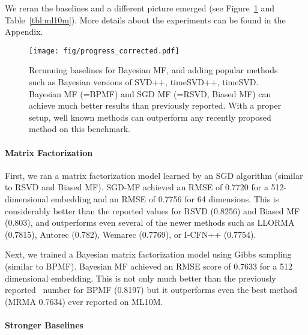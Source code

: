 \documentclass{article}
\newcommand\rmsersvd{0.8256}
\newcommand\rmsebpmf{0.8197}
\newcommand\rmsebiasmf{0.803}
\newcommand\rmseiautorec{0.782}
\newcommand\rmsellorma{0.7815}
\newcommand\rmsewemarec{0.7769}
\newcommand\rmseicfnpp{0.7754}
\newcommand\rmsemrma{0.7634}
\newcommand\rmsebfmui{0.7633}
\newcommand\rmsefmui{0.7720}
\newcommand\rmsefmuimed{0.7756}
\begin{document}
We reran the baselines and a different picture emerged (see Figure~\ref{fig:ml10m_progress_corrected} and Table~\ref{tbl:ml10m}).
More details about the experiments can be found in the Appendix.

\begin{figure}[t]
    \centering
    \texttt{[image: fig/progress\_corrected.pdf]}
    \caption{Rerunning baselines for Bayesian MF, and adding popular methods such as Bayesian versions of SVD++, timeSVD++, timeSVD\protect\footnotemark.
    Bayesian MF (=BPMF) and SGD MF (=RSVD, Biased MF) can achieve much better results than previously reported.
    With a proper setup, well known methods can outperform any recently proposed method on this benchmark.}
    \label{fig:ml10m_progress_corrected}
\end{figure}





\paragraph{Matrix Factorization}

First, we ran a matrix factorization model learned by an SGD algorithm (similar to RSVD and Biased MF).
SGD-MF achieved an RMSE of {\rmsefmui} for a 512-dimensional embedding and an RMSE of {\rmsefmuimed} for 64 dimensions.
This is considerably better than the reported values for RSVD ({\rmsersvd}) and Biased MF ({\rmsebiasmf}), and outperforms even several of the newer methods such as LLORMA ({\rmsellorma}), Autorec ({\rmseiautorec}), Wemarec ({\rmsewemarec}), or I-CFN++ ({\rmseicfnpp}).

Next, we trained a Bayesian matrix factorization model using Gibbs sampling (similar to BPMF).
Bayesian MF achieved an RMSE score of {\rmsebfmui} for a 512 dimensional embedding.
This is not only much better than the previously reported~\cite{li:icml16,strub:arxiv16} number for BPMF ({\rmsebpmf}) but it outperforms even the best method (MRMA {\rmsemrma}) ever reported on ML10M.


\paragraph{Stronger Baselines}
\end{document}

